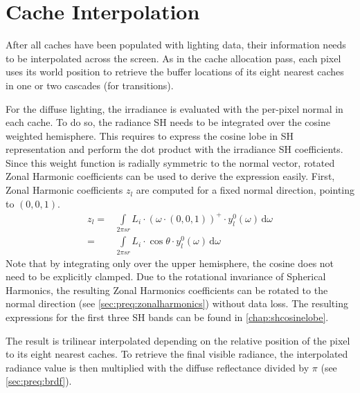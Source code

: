 \documentclass[thesis.tex]{subfiles}
\begin{document}
\section{Cache Interpolation}
After all caches have been populated with lighting data, their information needs to be interpolated across the screen.
As in the cache allocation pass, each pixel uses its world position to retrieve the buffer locations of its eight nearest caches in one or two cascades (for transitions).
 
For the diffuse lighting, the irradiance is evaluated with the per-pixel normal in each cache.
To do so, the radiance SH needs to be integrated over the cosine weighted hemisphere.
This requires to express the cosine lobe in SH representation and perform the dot product with the irradiance SH coefficients.
Since this weight function is radially symmetric to the normal vector, rotated Zonal Harmonic coefficients can be used to derive the expression easily.
First, Zonal Harmonic coefficients $z_l$ are computed for a fixed normal direction, pointing to $(0,0,1)$.
\begin{align}
z_l =&\int\limits_{2 \pi sr} L_i \cdot (\omega \cdot (0,0,1))^+ \cdot y^0_l(\omega) \,\mathrm{d}\omega\\
=&\int\limits_{2 \pi sr} L_i \cdot \cos\theta \cdot y^0_l(\omega) \,\mathrm{d}\omega
\end{align}
Note that by integrating only over the upper hemisphere, the cosine does not need to be explicitly clamped.
Due to the rotational invariance of Spherical Harmonics, the resulting Zonal Harmonics coefficients can be rotated to the normal direction (see \autoref{sec:preq:zonalharmonics}) without data loss.
The resulting expressions for the first three SH bands can be found in \autoref{chap:shcosinelobe}.

The result is trilinear interpolated depending on the relative position of the pixel to its eight nearest caches.
To retrieve the final visible radiance, the interpolated radiance value is then multiplied with the diffuse reflectance divided by $\pi$ (see \autoref{sec:preq:brdf}).
\end{document}
